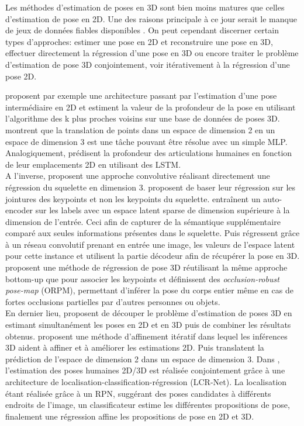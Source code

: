 Les méthodes d'estimation de poses en 3D sont bien moins matures que celles d'estimation de pose en 2D. Une des raisons principale à ce jour serait le manque de jeux de données fiables disponibles \cite{2018arXiv180309722Y}.
On peut cependant discerner certain types d'approches: estimer une pose en 2D et reconstruire une pose en 3D, effectuer directement la régression d'une pose en 3D ou encore traiter le problème d'estimation de pose 3D conjointement, voir itérativement à la régression d'une pose 2D.


\cite{2016arXiv161206524C} proposent par exemple une architecture passant par l'estimation d'une pose intermédiaire en 2D et estiment la valeur de la profondeur de la pose en utilisant l'algorithme des k plus proches voisins sur une base de données de poses 3D.
\cite{martinez2017simple} montrent que la translation de points dans un espace de dimension 2 en un espace de dimension 3 est une tâche pouvant être résolue avec un simple MLP.
Analogiquement, \cite{nie2017monocular} prédisent la profondeur des articulations humaines en fonction de leur emplacements 2D en utilisant des LSTM.\\

A l'inverse, \cite{li20143d} proposent une approche convolutive réalisant directement une régression du squelette en dimension 3. \cite{sun2017compositional} proposent de baser leur régression sur les jointures des keypoints et non les keypoints du squelette.
\cite{tekin2016structured} entraînent un auto-encoder sur les labels avec un espace latent sparse de dimension supérieure à la dimension de l'entrée. Ceci afin de capturer de la sémantique supplémentaire comparé aux seules informations présentes dans le squelette. Puis régressent grâce à un réseau convolutif prenant en entrée une image, les valeurs de l'espace latent pour cette instance et utilisent la partie décodeur afin de récupérer la pose en 3D.\cite{singleshotmultiperson2018} proposent une  méthode de régression de pose 3D réutilisant la même approche bottom-up que \cite{cao2017realtime} pour associer les keypoints et définissent des \textit{occlusion-robust pose-map} (ORPM), permettant d'inférer la pose du corps entier même en cas de fortes occlusions partielles par d'autres personnes ou objets.\\

En dernier lieu, \cite{simo2013joint} proposent de découper le problème d'estimation de poses 3D en estimant simultanément les poses en 2D et en 3D puis de combiner les résultats obtenus. \cite{tome2017lifting} proposent une méthode d'affinement itératif dans lequel les inférences 3D aident à affiner et à améliorer les estimations 2D. Puis translatent la prédiction de l'espace de dimension 2 dans un espace de dimension 3. Dans \cite{rogez2019lcr}, l'estimation des poses humaines 2D/3D est réalisée conjointement grâce à une architecture de localisation-classification-régression (LCR-Net). La localisation étant réalisée grâce à un RPN, suggérant des poses candidates à différents endroits de l'image, un classificateur estime les différentes propositions de pose, finalement une régression affine les propositions de pose en 2D et 3D.

